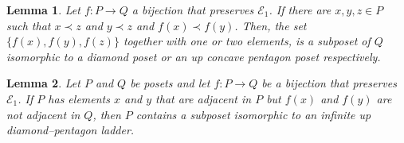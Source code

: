 \documentclass[10pt,a4paper]{amsart}
\newtheorem{lemma}{Lemma}
\newcommand{\E}{\mathcal{E}}
\begin{document}
\begin{lemma}
    Let $f: P \to Q$ a bijection that preserves $\E_1$. If there are $x,y,z \in P$ such that $x \prec z$ and $y \prec z$ and $f(x) \prec f(y)$. Then, the set $\{f(x), f(y), f(z)\}$ together with one or two elements, is a subposet of $Q$ isomorphic to a diamond poset or an up concave pentagon poset respectively.
    \label{lemma:diamond_pentagon_shape}
\end{lemma}

\begin{lemma}
   Let $P$ and $Q$ be posets and let $f: P \to Q$ be a bijection that preserves $\E_1$. If $P$ has elements $x$ and $y$ that are adjacent in $P$ but $f(x)$ and $f(y)$ are not adjacent in $Q$, then $P$ contains a subposet isomorphic to an infinite up diamond–pentagon ladder.
    \label{lemma:covers_preserved_E}
\end{lemma}
\end{document}
